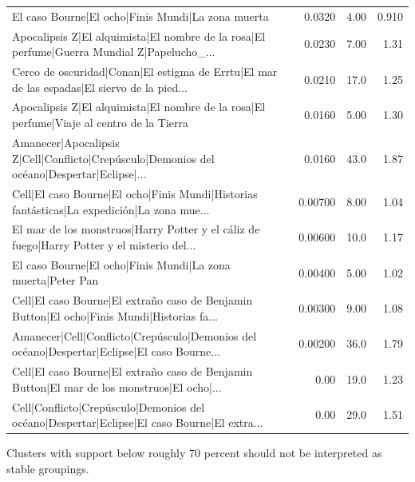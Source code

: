 \begin{table}[htbp]
\begin{tabular}{lrrr}
El caso Bourne|El ocho|Finis Mundi|La zona muerta & 0.0320 & 4.00 & 0.910 \\
Apocalipsis Z|El alquimista|El nombre de la rosa|El perfume|Guerra Mundial Z|Papelucho\_... & 0.0230 & 7.00 & 1.31 \\
Cerco de oscuridad|Conan|El estigma de Errtu|El mar de las espadas|El siervo de la pied... & 0.0210 & 17.0 & 1.25 \\
Apocalipsis Z|El alquimista|El nombre de la rosa|El perfume|Viaje al centro de la Tierra & 0.0160 & 5.00 & 1.30 \\
Amanecer|Apocalipsis Z|Cell|Conflicto|Crepúsculo|Demonios del océano|Despertar|Eclipse|... & 0.0160 & 43.0 & 1.87 \\
Cell|El caso Bourne|El ocho|Finis Mundi|Historias fantásticas|La expedición|La zona mue... & 0.00700 & 8.00 & 1.04 \\
El mar de los monstruos|Harry Potter y el cáliz de fuego|Harry Potter y el misterio del... & 0.00600 & 10.0 & 1.17 \\
El caso Bourne|El ocho|Finis Mundi|La zona muerta|Peter Pan & 0.00400 & 5.00 & 1.02 \\
Cell|El caso Bourne|El extraño caso de Benjamin Button|El ocho|Finis Mundi|Historias fa... & 0.00300 & 9.00 & 1.08 \\
Amanecer|Cell|Conflicto|Crepúsculo|Demonios del océano|Despertar|Eclipse|El caso Bourne... & 0.00200 & 36.0 & 1.79 \\
Cell|El caso Bourne|El extraño caso de Benjamin Button|El mar de los monstruos|El ocho|... & 0.00 & 19.0 & 1.23 \\
Cell|Conflicto|Crepúsculo|Demonios del océano|Despertar|Eclipse|El caso Bourne|El extra... & 0.00 & 29.0 & 1.51 \\
\bottomrule
\end{tabular}
\vspace{0.5em}
\begin{minipage}{\linewidth}\footnotesize Clusters with support below roughly 70 percent should not be interpreted as stable groupings.\end{minipage}
\end{table}

